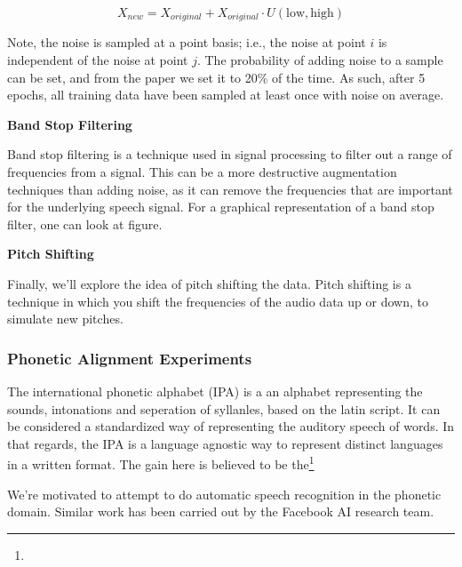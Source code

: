 $$ X_{new} = X_{original} + X_{original} \cdot U(\text{low}, \text{high}) $$

Note, the noise is sampled at a point basis; i.e., the noise at point $i$ is independent of the noise at point $j$. The probability of adding noise to a sample can be set, and from the paper we set it to 20\% of the time. As such, after 5 epochs, all training data have been sampled at least once with noise on average.

\textbf{Band Stop Filtering}

Band stop filtering is a technique used in signal processing to filter out a range of frequencies from a signal. This can be a more destructive augmentation techniques than adding noise, as it can remove the frequencies that are important for the underlying speech signal. For a graphical representation of a band stop filter, one can look at figure. %

\textbf{Pitch Shifting}

Finally, we'll explore the idea of pitch shifting the data. Pitch shifting is a technique in which you shift the frequencies of the audio data up or down, to simulate new pitches.

\subsubsection{Phonetic Alignment Experiments}

The international phonetic alphabet (IPA) is a an alphabet representing the sounds, intonations and seperation of syllanles, based on the latin script. It can be considered a standardized way of representing the auditory speech of words. In that regards, the IPA is a language agnostic way to represent distinct languages in a written format. The gain here is believed to be the\footnote{}

We're motivated to attempt to do automatic speech recognition in the phonetic domain. Similar work has been carried out by the Facebook AI research team.\cite{xu_simple_2021}